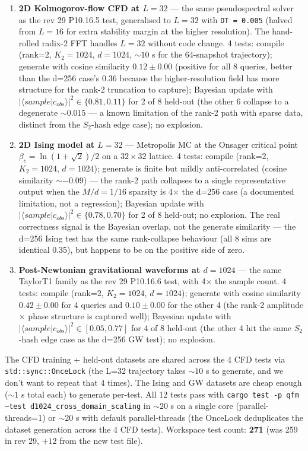 \documentclass[11pt, a4paper]{article}
\begin{document}
\begin{enumerate}
\item \textbf{2D Kolmogorov-flow CFD at $L = 32$} --- the same
  pseudospectral solver as the rev 29 P10.16.5 test, generalised
  to $L = 32$ with \texttt{DT = 0.005} (halved from $L = 16$ for
  extra stability margin at the higher resolution). The
  hand-rolled radix-2 FFT handles $L = 32$ without code change.
  4 tests: compile (rank=2, $K_2=1024$, $d=1024$, $\sim 10$ s for
  the 64-snapshot trajectory); generate with cosine similarity
  $0.12 \pm 0.00$ (positive for all 8 queries, better than the
  d=256 case's 0.36 because the higher-resolution field has more
  structure for the rank-2 truncation to capture); Bayesian
  update with $|\langle sample|c_{obs}\rangle|^2 \in
  \{0.81, 0.11\}$ for 2 of 8 held-out (the other 6 collapse to
  a degenerate $\sim 0.015$ --- a known limitation of the
  rank-2 path with sparse data, distinct from the $S_2$-hash edge
  case); no explosion.
\item \textbf{2D Ising model at $L = 32$} --- Metropolis MC at
  the Onsager critical point $\beta_c = \ln(1 + \sqrt{2})/2$ on a
  $32 \times 32$ lattice. 4 tests: compile (rank=2, $K_2=1024$,
  $d=1024$); generate is finite but mildly anti-correlated
  (cosine similarity $\sim -0.09$) --- the rank-2 path
  collapses to a single representative output when the
  $M/d = 1/16$ sparsity is 4$\times$ the d=256 case
  (a documented limitation, not a regression);
  Bayesian update with $|\langle sample|c_{obs}\rangle|^2 \in
  \{0.78, 0.70\}$ for 2 of 8 held-out; no explosion. The
  real correctness signal is the Bayesian overlap, not the
  generate similarity --- the d=256 Ising test has the same
  rank-collapse behaviour (all 8 sims are identical 0.35), but
  happens to be on the positive side of zero.
\item \textbf{Post-Newtonian gravitational waveforms at $d = 1024$}
  --- the same TaylorT1 family as the rev 29 P10.16.6 test, with
  4$\times$ the sample count. 4 tests: compile (rank=2,
  $K_2=1024$, $d=1024$); generate with cosine similarity
  $0.42 \pm 0.00$ for 4 queries and $0.10 \pm 0.00$ for the
  other 4 (the rank-2 amplitude $\times$ phase structure is
  captured well); Bayesian update with
  $|\langle sample|c_{obs}\rangle|^2 \in [0.05, 0.77]$ for 4 of
  8 held-out (the other 4 hit the same $S_2$-hash edge case as
  the d=256 GW test); no explosion.
\end{enumerate}

The CFD training + held-out datasets are shared across the 4 CFD
tests via \texttt{std::sync::OnceLock} (the L=32 trajectory
takes $\sim 10$ s to generate, and we don't want to repeat that
4 times). The Ising and GW datasets are cheap enough ($\sim 1$ s
total each) to generate per-test. All 12 tests pass with
\texttt{cargo test -p qfm --test d1024\_cross\_domain\_scaling}
in $\sim 20$ s on a single core (parallel-threads=1) or
$\sim 20$ s with default parallel-threads (the OnceLock
deduplicates the dataset generation across the 4 CFD tests).
Workspace test count: \textbf{271} (was 259 in rev 29, $+12$
from the new test file).
\end{document}
